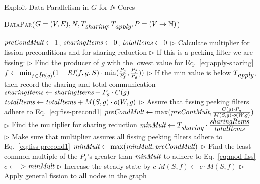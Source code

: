 \begin{algorithm}[th!]
\caption{Exploit Data Parallelism in $G$ for $N$
  Cores} \label {alg:data-parallelize}
\footnotesize
\textsc{DataPar}($G=(V, E), N, T_{\mbox{\it sharing}},
T_{\mbox{\it apply}}, P=(V \rightarrow \mathbb{N}) $)
\begin{algorithmic}[1]
\State $\mbox{\it preCondMult} \gets 1$, $\mbox{\it sharingItems} \gets 0$, $\mbox{\it totalItems} \gets 0$
\State $\triangleright$ Calculate multiplier for fission preconditions and for sharing reduction
\State $\triangleright$ If this is a peeking filter we are fissing:
\State $\triangleright$ Find the producer of $g$ with the lowest
value for Eq.~\ref{eq:apply-sharing}
\State $f \gets \min_{f \in \mbox{\it In}(g)} (1 -\mbox{\it RI}(f,g, S) \cdot
\min(\frac{P_g}{P_f},\frac{P_f}{P_g} )) $
\label{ln:dp1}
\State $\triangleright$ If the min value is below $T_{\mbox{\it apply}}$,
then record the sharing and total communication
\State $\mbox{\it sharingItems} \gets \mbox{\it sharingItems} + P_g \cdot C(g)$
\State $\mbox{\it totalItems} \gets \mbox{\it totalItems} + M(S,g) \cdot o(W, g)$
\EndIf 
\State $\triangleright$ Assure that fissing peeking filters adhere to Eq.~\ref{eq:fiss-precond1}
\State $\mbox{\it preCondMult} \gets \max(\mbox{\it preContMult}, \frac{C(g) \cdot P_g}{M(S,g)
 \cdot o(W,g)})$  
\label{ln:dp3}
\EndIf
\EndFor
\State $\triangleright$ Find the multiplier for sharing reduction
\State $\mbox{\it minMult} \gets T_{\mbox{\it sharing}} \cdot \frac{\mbox{\it sharingItems}
}{\mbox{\it totalItems}}$
\label{ln:dp2}
\State $\triangleright$ Make sure that multiplier assures all fissing peeking filters
adhere to  Eq.~\ref{eq:fiss-precond1}
\State $\mbox{\it minMult} \gets \max(\mbox{\it minMult}, \mbox{\it preCondMult})$
\State $\triangleright$ Find the least common multiple of the $P_f$'s
greater than $\mbox{\it minMult}$ to adhere to Eq.~\ref{eq:mod-fiss}
\State $c \gets $ $ >
\mbox{\it minMult}$
\label{ln:dp4}
\State $\triangleright$ Increase the steady-state by $c$
\State $M(S,f) \gets c \cdot M(S, f)$
\EndFor
\State $\triangleright$ Apply general fission to all nodes in the graph
\State {}
\EndFor
\end{algorithmic}
\end{algorithm}


